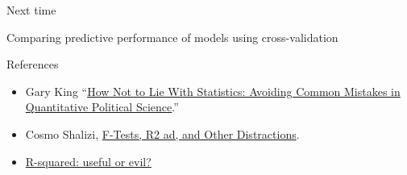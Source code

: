 \documentclass[ignorenonframetext,]{beamer}
\providecommand{\tightlist}{%
  \setlength{\itemsep}{0pt}\setlength{\parskip}{0pt}}
\begin{document}
\begin{frame}{Next time}

Comparing predictive performance of models using cross-validation

\end{frame}

\begin{frame}{References}

\begin{itemize}[<+->]
\tightlist
\item
  Gary King ``\href{http://gking.harvard.edu/files/mist.pdf}{How Not to
  Lie With Statistics: Avoiding Common Mistakes in Quantitative
  Political Science}.''
\item
  Cosmo Shalizi,
  \href{http://www.stat.cmu.edu/~cshalizi/mreg/15/lectures/10/lecture-10.pdf}{F-Tests,
  R2 ad, and Other Distractions}.
\item
  \href{http://andrewgelman.com/2007/08/29/rsquared_useful/}{R-squared:
  useful or evil?}
\end{itemize}

\end{frame}
\end{document}
